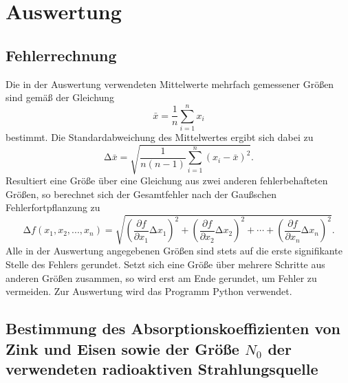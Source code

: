 \documentclass[
  bibliography=totoc,     %
  captions=tableheading,  %
  titlepage=firstiscover, %
]{scrartcl}
\begin{document}
\section{Auswertung}
\label{sec:auswertung}
\subsection{Fehlerrechnung}
\label{sec:fehlerrechnung}
Die in der Auswertung verwendeten Mittelwerte mehrfach gemessener Größen sind gemäß der
Gleichung
\begin{equation}
\bar{x}=\frac{1}{n}\sum_{i=1}^n x_i
\label{eqn:mittelwert}
\end{equation}
bestimmt. Die Standardabweichung des Mittelwertes ergibt sich dabei zu
\begin{equation}
\mathup{\Delta}\bar{x}=\sqrt{\frac{1}{n(n-1)}\sum_{i=1}^n\left(x_i-\bar{x}\right)^2}.
\label{eqn:standardabweichung}
\end{equation}
Resultiert eine Größe über eine Gleichung aus zwei anderen fehlerbehafteten Größen, so
berechnet sich der Gesamtfehler nach der Gaußschen Fehlerfortpflanzung zu
\begin{equation}
\mathup{\Delta}f(x_1,x_2,...,x_n)=\sqrt{\left(\frac{\partial f}{\partial x_1}\mathup{\Delta}x_1\right)^2+\left(\frac{\partial f}{\partial x_2}\mathup{\Delta}x_2\right)^2+ \dotsb +\left(\frac{\partial f}{\partial x_n}\mathup{\Delta}x_n\right)^2}.
\label{eqn:fehlerfortpflanzung}
\end{equation}
Alle in der Auswertung angegebenen Größen sind stets auf die erste signifikante Stelle des
Fehlers gerundet. Setzt sich eine Größe über mehrere Schritte aus anderen Größen zusammen,
so wird erst am Ende gerundet, um Fehler zu vermeiden. Zur Auswertung wird das Programm
Python verwendet.
\subsection{Bestimmung des Absorptionskoeffizienten von Zink und Eisen sowie der Größe $N_0$ der verwendeten radioaktiven Strahlungsquelle}
\end{document}
